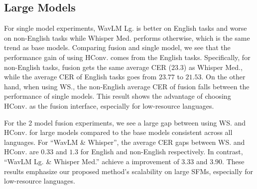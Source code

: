 \subsection{Large Models}
For single model experiments, WavLM Lg. is better on English tasks and worse on non-English tasks while Whisper Med. performs otherwise, which is the same trend as base models.
Comparing fusion and single model, we see that the performance gain of using HConv. comes from the English tasks.
Specifically, for non-English tasks, fusion gets the same average CER ($23.3$) as Whisper Med., while the average CER of English tasks goes from $23.77$ to $21.53$.
On the other hand, when using WS., the non-English average CER of fusion falls between the performance of single models.
This result shows the advantage of choosing HConv. as the fusion interface, especially for low-resource languages.

For the 2 model fusion experiments, we see a large gap between using WS. and HConv. for large models compared to the base models consistent across all languages.
For ``WavLM \& Whisper'', the average CER gaps between WS. and HConv. are $0.33$ and  $1.3$ for English and non-English respectively.
In contrast, ``WavLM Lg. \& Whisper Med.'' achieve a improvement of $3.33$ and $3.90$.
These results emphasize our proposed method's scalability on large SFMs, especially for low-resource languages.